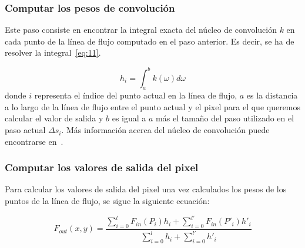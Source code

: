 \subsubsection{Computar los pesos de convolución}
\label{ref:convolution}

Este paso consiste en encontrar la integral exacta del núcleo de convolución $k$
en cada punto de la línea de flujo computado en el paso anterior. Es decir, se
ha de resolver la integral~\eqref{eq:11}.

\begin{equation}
		h_i = \int_{a}^{b}k(\omega) d\omega \label{eq:11}
\end{equation}
donde $i$ representa el índice del punto actual en la línea de flujo, $a$
es la distancia a lo largo de la línea de flujo entre el punto actual y el pixel
para el que queremos calcular el valor de salida y $b$ es igual a $a$ más el
tamaño del paso utilizado en el paso actual $\Delta s_i$. Más información acerca
del núcleo de convolución puede encontrarse en~\citet{osti_10185520}.

\subsubsection{Computar los valores de salida del pixel}
\label{ref:salida}

Para calcular los valores de salida del pixel una vez calculados los pesos de
los puntos de la línea de flujo, se sigue la siguiente ecuación:

\begin{equation}
		F_{out}(x,y) =
		\frac{\sum\limits_{i=0}^{l}{F_{in}(P_i)h_i}+\sum\limits_{i=0}^{l'}{F_{in}(P'_i)h'_i}}{\sum\limits_{i=0}^{l}{h_i} + \sum\limits_{i=0}^{l'}{h'_i}} \label{eq:12}
\end{equation}
